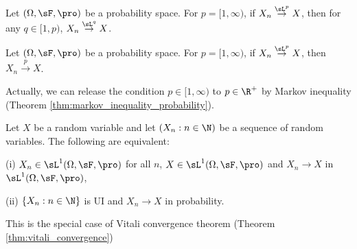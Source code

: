 \begin{proposition}\label{pro:convergence_slp_monotone_probability}
Let $(\Omega,\sF,\pro)$ be a probability space. For $p=[1,\infty)$, if $X_n\stackrel{\sL^p}{\to} X$, then for any $q \in [1,p)$, $X_n \stackrel{\sL^q}{\to} X$.
\end{proposition}

\begin{proposition}\label{pro:convergence_slp_implies_probability}
Let $(\Omega,\sF,\pro)$ be a probability space. For $p=[1,\infty)$, if $X_n\stackrel{\sL^p}{\to} X$, then $X_n \xrightarrow{p} X$.
\end{proposition}

\begin{remark}
Actually, we can release the condition $p \in [1,\infty)$ to $p \in \R^+$ by Markov inequality (Theorem \ref{thm:markov_inequality_probability}).
\end{remark}


\begin{theorem}\label{thm:ui_prob_iff_sl1}
Let $X$ be a random variable and let $(X_n : n \in \N)$ be a sequence of random variables. The following are equivalent:
\ben
\item [(i)] $X_n \in \sL^1(\Omega,\sF,\pro)$ for all $n$, $X \in \sL^1(\Omega,\sF,\pro)$ and $X_n \to X$ in $\sL^1(\Omega,\sF,\pro)$,
\item [(ii)] $\{X_n : n \in \N\}$ is UI and $X_n \to X$ in probability.
\een
\end{theorem}

\begin{remark}
This is the special case of Vitali convergence theorem (Theorem \ref{thm:vitali_convergence})
\end{remark}

